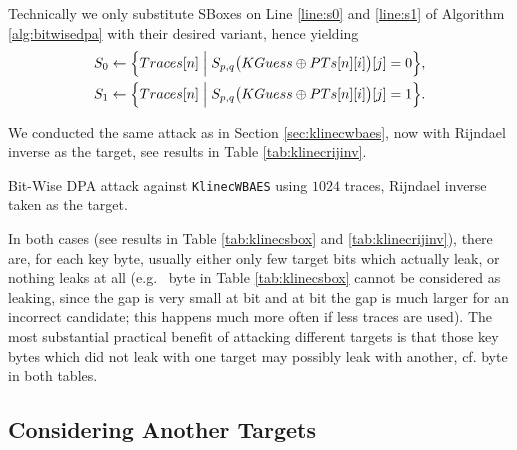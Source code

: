 \begin{remark}
	Technically we only substitute SBoxes on Line \ref{line:s0} and \ref{line:s1} of Algorithm \ref{alg:bitwisedpa} with their desired variant, hence yielding
	\begin{align*}
		S_0 &\gets \Bigl\{ Traces[n] \Bigm| S_{p,q}\bigl(KGuess\oplus PTs[n][i]\bigr)[j] = 0 \Bigr\} , \\
		S_1 &\gets \Bigl\{ Traces[n] \Bigm| S_{p,q}\bigl(KGuess\oplus PTs[n][i]\bigr)[j] = 1 \Bigr\} .
	\end{align*}
\end{remark}

We conducted the same attack as in Section \ref{sec:klinecwbaes}, now with Rijndael inverse as the target, see results in Table \ref{tab:klinecrijinv}.

\begin{landscape}
\begin{table}[H]
	\begin{center}
	
	\end{center}
\caption{Bit-Wise DPA attack against {\tt KlinecWBAES} using $1024$ traces, Rijndael inverse taken as the target.}
\label{tab:klinecrijinv}
\end{table}
\end{landscape}

In both cases (see results in Table \ref{tab:klinecsbox} and \ref{tab:klinecrijinv}), there are, for each key byte, usually either only few target bits which actually leak, or nothing leaks at all (e.g.\  byte in Table \ref{tab:klinecsbox} cannot be considered as leaking, since the gap is very small at  bit and at  bit the gap is much larger for an incorrect candidate; this happens much more often if less traces are used). The most substantial practical benefit of attacking different targets is that those key bytes which did not leak with one target may possibly leak with another, cf.  byte in both tables.



\subsection{Considering Another Targets}
\label{sec:16targets}


